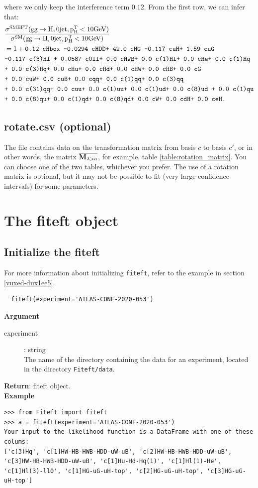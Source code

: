 \documentclass[12pt]{article}
\def\b#1{\boldsymbol{\rm #1}}
\newcommand{\SM}{\text{SM}}
\begin{document}
 where we only keep the interference term $0.12$. From the first row, we can infer that:
 \begin{align}
   &\rm \frac{\sigma^{SMEFT}(gg\to H,0jet,p^T_H<10GeV)}{\sigma^\SM(gg\to H,0jet,p^T_H<10GeV)} \nonumber \\ \nonumber&= 1+ \texttt{0.12 cHbox -0.0294 cHDD+ 42.0 cHG -0.117 cuH+ 1.59 cuG}\\ \nonumber
   &\texttt{-0.117 c(3)Hl + 0.0587 c0ll+ 0.0 cHWB+ 0.0 c(1)Hl+ 0.0 cHe+ 0.0 c(1)Hq}\\ \nonumber
   &\texttt{+ 0.0 c(3)Hq+ 0.0 cHu+ 0.0 cHd+ 0.0 cHW+ 0.0 cHB+ 0.0 cG}\\ \nonumber
   &\texttt{+ 0.0 cuW+ 0.0 cuB+ 0.0 cqq+ 0.0 c(1)qq+ 0.0 c(3)qq}\\ \nonumber&
   \texttt{+ 0.0 c(31)qq+ 0.0 cuu+ 0.0 c(1)uu+ 0.0 c(1)ud+ 0.0 c(8)ud + 0.0 c(1)qu}\\ \nonumber
   &\texttt{+ 0.0 c(8)qu+ 0.0 c(1)qd+ 0.0 c(8)qd+ 0.0 cW+ 0.0 cdH+ 0.0 ceH.}
 \end{align}
 \subsection{rotate.csv (optional)}
 The file contains data on the transformation matrix from basis $c$ to basis $c'$, or in other words, the matrix $\overline{\b M_{\lambda >a}}$, for example, table \ref{table:rotation_matrix}. You can choose one of the two tables, whichever you prefer. The use of a rotation matrix is optional, but it may not be possible to fit (very large confidence intervals) for some parameters.
 \clearpage
 \section{The fiteft object}
 \subsection{Initialize the fiteft}
 For more information about initializing \verb|fiteft|, refer to the example in section \ref{vuxed-dux1ee5}.
 \begin{verbatim}
  fiteft(experiment='ATLAS-CONF-2020-053')
  \end{verbatim}
\textbf{Argument}
\begin{description}
 \item[experiment]: string\\
 The name of the directory containing the data for an experiment, located in the directory \verb|Fiteft/data|.
\end{description}
\textbf{Return}: fiteft object.\\
\textbf{Example}\\
\begin{verbatim}
>>> from Fiteft import fiteft
>>> a = fiteft(experiment='ATLAS-CONF-2020-053')
Your input to the likelihood function is a DataFrame with one of these colums:
['c(3)Hq', 'c[1]HW-HB-HWB-HDD-uW-uB', 'c[2]HW-HB-HWB-HDD-uW-uB', 'c[3]HW-HB-HWB-HDD-uW-uB', 'c[1]Hu-Hd-Hq(1)', 'c[1]Hl(1)-He', 'c[1]Hl(3)-ll0', 'c[1]HG-uG-uH-top', 'c[2]HG-uG-uH-top', 'c[3]HG-uG-uH-top']
\end{verbatim}
\end{document}
